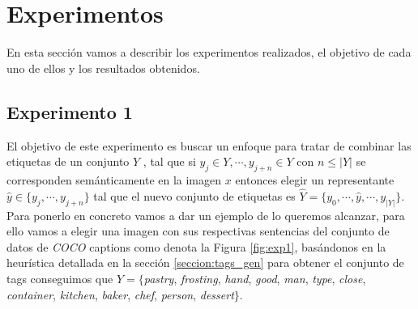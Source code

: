 \chapter{Experimentos} \label{chapter:chapter4}

En esta sección vamos a describir los experimentos realizados, el objetivo de cada uno de ellos y los resultados obtenidos.

\section{Experimento 1} \label{sec:exp1}

El objetivo de este experimento es buscar un enfoque para tratar de combinar las etiquetas de un conjunto $Y$ , tal que si $y_{j} \in Y, \cdots , y_{j + n} \in Y$ con  $n \leqslant |Y|$ se corresponden semánticamente en la imagen $x$ entonces elegir un representante $\hat{y} \in \{y_{j}, \cdots, y_{j+ n}\}$ tal que el nuevo conjunto de etiquetas es $\hat{Y} = \{ y_{0}, \cdots ,\hat{y}, \cdots , y_{|Y|}\}$. Para ponerlo en concreto vamos a dar un ejemplo de lo queremos alcanzar, para ello vamos a elegir una imagen con sus respectivas sentencias del conjunto de datos de \textit{COCO} captions como denota la Figura \ref{fig:exp1}, basándonos en la heurística detallada en la sección \ref{seccion:tags_gen} para obtener el conjunto de tags conseguimos que $Y = \{ $\textit{pastry}, \textit{frosting}, \textit{hand}, \textit{good}, \textit{man}, \textit{type}, \textit{close}, \textit{container}, \textit{kitchen}, \textit{baker}, \textit{chef}, \textit{person}, \textit{dessert}$\}$.


